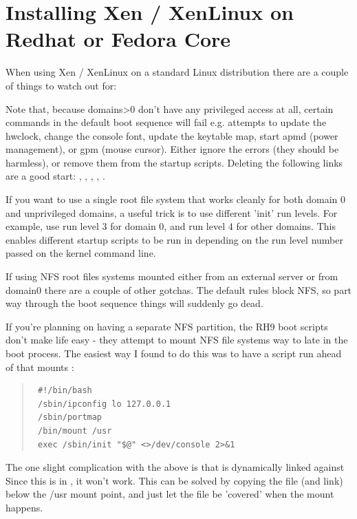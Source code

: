\documentclass[11pt,twoside,final,openright]{report}
\begin{document}
{\chapter{Installing Xen / XenLinux on Redhat or Fedora Core}

When using Xen / XenLinux on a standard Linux distribution there are
a couple of things to watch out for:

Note that, because domains>0 don't have any privileged access at all,
certain commands in the default boot sequence will fail e.g. attempts
to update the hwclock, change the console font, update the keytable
map, start apmd (power management), or gpm (mouse cursor).  Either
ignore the errors (they should be harmless), or remove them from the
startup scripts.  Deleting the following links are a good start:
{}, {},
{}, {},
{}.

If you want to use a single root file system that works cleanly for
both domain 0 and unprivileged domains, a useful trick is to use
different 'init' run levels. For example, use
run level 3 for domain 0, and run level 4 for other domains. This
enables different startup scripts to be run in depending on the run
level number passed on the kernel command line.

If using NFS root files systems mounted either from an
external server or from domain0 there are a couple of other gotchas.
The default {} rules block NFS, so part
way through the boot sequence things will suddenly go dead.

If you're planning on having a separate NFS {} partition, the
RH9 boot scripts don't make life easy - they attempt to mount NFS file
systems way to late in the boot process. The easiest way I found to do
this was to have a {} script run ahead of
{} that mounts {}:

\begin{quote}
\begin{small}\begin{verbatim}
 #!/bin/bash
 /sbin/ipconfig lo 127.0.0.1
 /sbin/portmap
 /bin/mount /usr
 exec /sbin/init "$@" <>/dev/console 2>&1
\end{verbatim}\end{small}
\end{quote}


The one slight complication with the above is that
{} is dynamically linked against
{} Since this is in
{}, it won't work. This can be solved by copying the
file (and link) below the /usr mount point, and just let the file be
'covered' when the mount happens.

}
\end{document}
